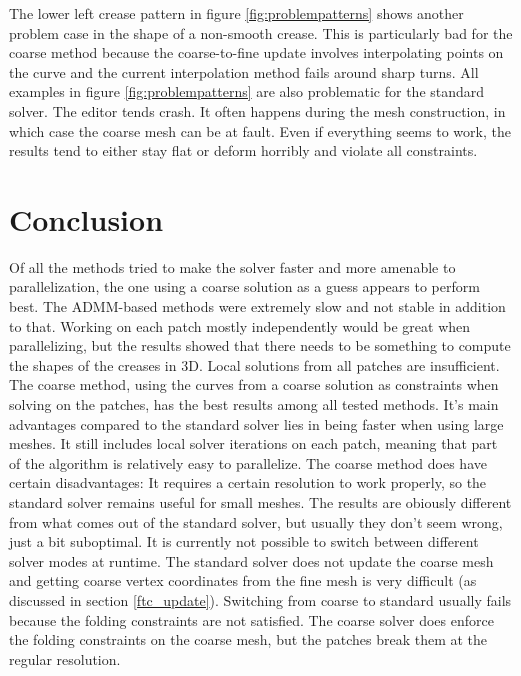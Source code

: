 \documentclass[a4paper,twoside,12pt,nochapterprefix]{scrbook}
\begin{document}
The lower left crease pattern in figure \ref{fig:problempatterns} shows another problem case in the shape of a non-smooth crease. This is particularly bad for the coarse method because the coarse-to-fine update involves interpolating points on the curve and the current interpolation method fails around sharp turns.\newline
All examples in figure \ref{fig:problempatterns} are also problematic for the standard solver. The editor tends crash. It often happens during the mesh construction, in which case the coarse mesh can be at fault. Even if everything seems to work, the results tend to either stay flat or deform horribly and violate all constraints.\newline
\chapter{Conclusion}\label{sec:conclusion}
Of all the methods tried to make the solver faster and more amenable to parallelization, the one using a coarse solution as a guess appears to perform best.\newline
The ADMM-based methods were extremely slow and not stable in addition to that. Working on each patch mostly independently would be great when parallelizing, but the results showed that there needs to be something to compute the shapes of the creases in 3D. Local solutions from all patches are insufficient.\newline
The coarse method, using the curves from a coarse solution as constraints when solving on the patches, has the best results among all tested methods. It's main advantages compared to the standard solver lies in being faster when using large meshes. It still includes local solver iterations on each patch, meaning that part of the algorithm is relatively easy to parallelize.\newline
The coarse method does have certain disadvantages: It requires a certain resolution to work properly, so the standard solver remains useful for small meshes. The results are obiously different from what comes out of the standard solver, but usually they don't seem wrong, just a bit suboptimal.\newline
It is currently not possible to switch between different solver modes at runtime. The standard solver does not update the coarse mesh and getting coarse vertex coordinates from the fine mesh is very difficult (as discussed in section \ref{ftc_update}). Switching from coarse to standard usually fails because the folding constraints are not satisfied. The coarse solver does enforce the folding constraints on the coarse mesh, but the patches break them at the regular resolution.\newline
\end{document}
